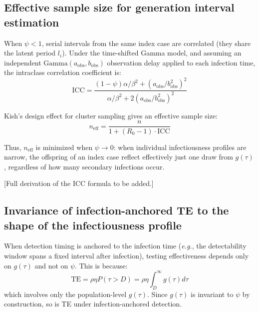\documentclass[10pt]{article}
\makeatletter
\newcommand{\eg}{\textit{e.g.}\@\xspace}
\makeatother
\begin{document}
\subsection{Effective sample size for generation interval estimation}
\label{sec:supp_neff}

When $\psi < 1$, serial intervals from the same index case are correlated (they share the latent period $l_i$). Under the time-shifted Gamma model, and assuming an independent $\text{Gamma}(a_\text{obs}, b_\text{obs})$ observation delay applied to each infection time, the intraclass correlation coefficient is:
\begin{equation}
	\text{ICC} = \frac{
	(1 - \psi) \alpha / \beta^2 + (a_\text{obs} / b_\text{obs}^2)^2
	}{
	\alpha / \beta^2 + 2 (a_\text{obs} / b_\text{obs}^2)^2}
\end{equation}

Kish's design effect for cluster sampling gives an effective sample size:
\begin{equation}
	n_\text{eff} = \frac{n}{1 + (R_0 - 1) \cdot \text{ICC}}
\end{equation}

Thus, $n_\text{eff}$ is minimized when $\psi \to 0$: when individual infectiousness profiles are narrow, the offspring of an index case reflect effectively just one draw from $g(\tau)$, regardless of how many secondary infections occur.

[Full derivation of the ICC formula to be added.]


\subsection{Invariance of infection-anchored TE to the shape of the infectiousness profile}
\label{sec:supp_TE_invariance}

When detection timing is anchored to the infection time (\eg, the detectability window spans a fixed interval after infection), testing effectiveness depends only on $g(\tau)$ and not on $\psi$. This is because:
\begin{equation}
	\text{TE} = \rho \eta P(\tau > D) = \rho \eta \int_D^\infty g(\tau) d\tau
\end{equation}
which involves only the population-level $g(\tau)$. Since $g(\tau)$ is invariant to $\psi$ by construction, so is TE under infection-anchored detection.
\end{document}
